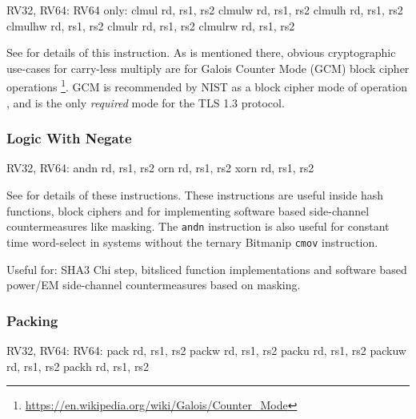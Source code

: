 \begin{cryptobitmanipisa}
RV32, RV64:                         RV64 only:
    clmul rd, rs1, rs2                  clmulw rd, rs1, rs2
    clmulh rd, rs1, rs2                 clmulhw rd, rs1, rs2
    clmulr rd, rs1, rs2                 clmulrw rd, rs1, rs2
\end{cryptobitmanipisa}

See \cite[Section 2.6]{riscv:bitmanip:draft} for details of
this instruction.
As is mentioned there, obvious cryptographic use-cases for carry-less
multiply are for Galois Counter Mode (GCM) block cipher operations
\footnote{\url{https://en.wikipedia.org/wiki/Galois/Counter_Mode}}.
GCM is recommended by NIST as a block cipher mode of operation
\cite{nist:gcm}, and is the only {\em required} mode for the TLS 1.3
protocol.



\subsubsection{Logic With Negate}

\begin{cryptobitmanipisa}
RV32, RV64:
    andn rd, rs1, rs2
     orn rd, rs1, rs2
    xorn rd, rs1, rs2
\end{cryptobitmanipisa}

See \cite[Section 2.1.3]{riscv:bitmanip:draft} for details of
these instructions.
These instructions are useful inside hash functions, block ciphers and
for implementing software based side-channel countermeasures like masking.
The {\tt andn} instruction is also useful for constant time word-select
in systems without the ternary Bitmanip {\tt cmov} instruction.

Useful for:
SHA3 Chi step,
bitsliced function implementations
and
software based power/EM side-channel countermeasures based on masking.

\subsubsection{Packing}

\begin{cryptobitmanipisa}
RV32, RV64:                         RV64: 
    pack   rd, rs1, rs2                 packw  rd, rs1, rs2
    packu  rd, rs1, rs2                 packuw rd, rs1, rs2
    packh  rd, rs1, rs2
\end{cryptobitmanipisa}

